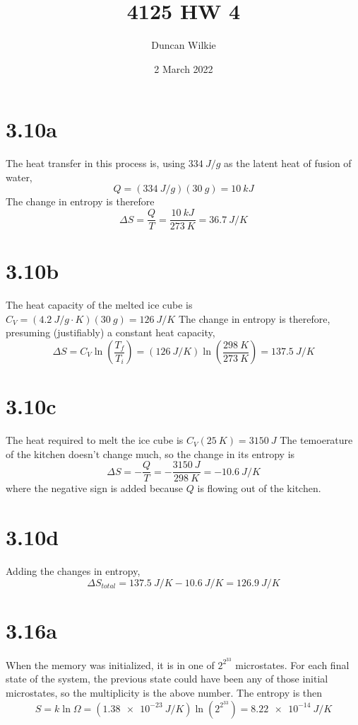 \documentclass{article}
\title{4125 HW 4}
\author{Duncan Wilkie}
\date{2 March 2022}
\begin{document}
\maketitle

\section*{3.10a}
The heat transfer in this process is, using $\SI{334}{J/g}$ as the latent heat of fusion of water,
\[Q=(\SI{334}{J/g})(\SI{30}{g})=\SI{10}{kJ}\]
The change in entropy is therefore
\[\Delta S=\frac{Q}{T}=\frac{\SI{10}{kJ}}{\SI{273}{K}}=\SI{36.7}{J/K}\]

\section*{3.10b}
The heat capacity of the melted ice cube is $C_{V}=(\SI{4.2}{J/g\cdot K})(\SI{30}{g})=\SI{126}{J/K}$
The change in entropy is therefore, presuming (justifiably) a constant heat capacity,
\[\Delta S=C_{V}\ln\left( \frac{T_{f}}{T_{i}} \right)=(\SI{126}{J/K})\ln\left( \frac{\SI{298}{K}}{\SI{273}{K}} \right)=\SI{137.5}{J/K}\]

\section*{3.10c}
The heat required to melt the ice cube is $C_{V}(\SI{25}{K})=\SI{3150}{J}$
The temoerature of the kitchen doesn't change much, so the change in its entropy is
\[\Delta S=-\frac{Q}{T}=-\frac{\SI{3150}{J}}{\SI{298}{K}}=-\SI{10.6}{J/K}\]
where the negative sign is added because $Q$ is flowing out of the kitchen.

\section*{3.10d}
Adding the changes in entropy,
\[\Delta S_{total}=\SI{137.5}{J/K}-\SI{10.6}{J/K}=\SI{126.9}{J/K}\]

\section*{3.16a}
When the memory was initialized, it is in one of  $2^{2^{33}}$ microstates. For each final state of the system, the previous state could have been any of those initial microstates, so the multiplicity is the above number. The entropy is then
\[S=k\ln\Omega=(\SI{1.38e-23}{J/K})\ln\left( 2^{2^{33}} \right)=\SI{8.22e-14}{J/K}\]
\end{document}
